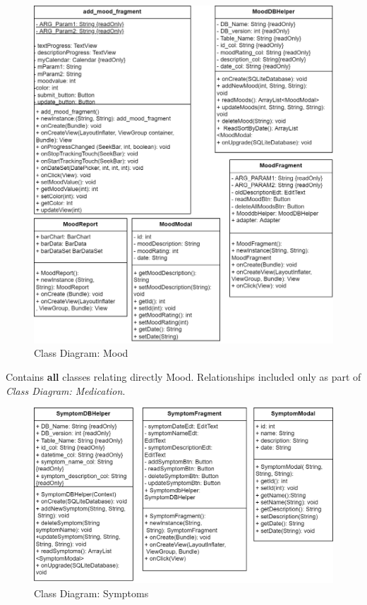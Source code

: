 \documentclass[11pt]{article}
\begin{document}
    \begin{figure}[H]
        \centering
        \includegraphics[width=\textwidth]{Diagrams/Class Diagrams/Class Diagram-Mood Classes}
        \caption{Class Diagram: Mood}
        \label{fig:figure2}
    \end{figure}

    Contains \textbf{all} classes relating directly Mood.
    Relationships included only as part of \textit{Class Diagram: Medication}.

    \begin{figure}[H]
        \centering
        \includegraphics[width=\textwidth]{Diagrams/Class Diagrams/Class Diagram-Symptoms Classes}
        \caption{Class Diagram: Symptoms}
        \label{fig:figure3}
    \end{figure}
\end{document}
